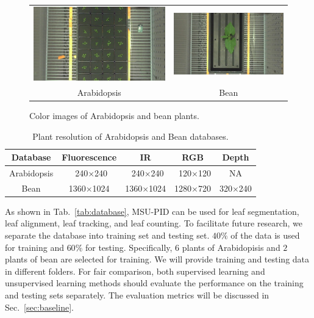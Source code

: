 \begin{figure}[h]
\begin{centering}
\begin{tabular}{c c}
\includegraphics[width=.45\textwidth]{Figures/rawImages/a.png}&
\includegraphics[width=.45\textwidth]{Figures/rawImages/b.png}\\
  Arabidopsis & Bean \\
\end{tabular}
\caption{Color images of Arabidopsis and bean plants. }
\label{fig:rawIm}
\end{centering}
\end{figure}

\begin{table}[h]
\begin{center}
\caption{Plant resolution of Arabidopsis and Bean databases.}
\label{tab:resolution}
\begin{tabular}{c|c|c|c|c}
      \hline
      Database     & Fluorescence       & IR        & RGB      & Depth     \\
      \hline
      Arabidopsis &  ~240$\times$240 &  ~240$\times$240 & ~120$\times$120  & NA  \\
      Bean        & 1360$\times$1024 & 1360$\times$1024 & 1280$\times$720 & 320$\times$240    \\
      \hline
\end{tabular}
\end{center}
\end{table}


As shown in Tab.~\ref{tab:database}, MSU-PID can be used for leaf segmentation, leaf alignment, leaf tracking, and leaf counting.
To facilitate future research, we separate the database into training set and testing set.
$40\%$ of the data is used for training and $60\%$ for testing.
Specifically, $6$ plants of Arabidopisis and $2$ plants of bean are selected for training.
We will provide training and testing data in different folders.
For fair comparison, both supervised learning and unsupervised learning methods should evaluate the performance on the training and testing sets separately.
The evaluation metrics will be discussed in Sec.~\ref{sec:baseline}.



